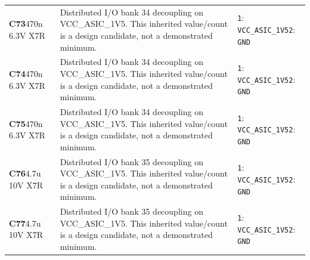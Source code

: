 \documentclass[11pt,a4paper]{article}
\begin{document}
\begin{longtable}{@{}P{27mm}P{84mm}P{57mm}@{}}
\textbf{C73}\newline 470n 6.3V X7R & Distributed I/O bank 34 decoupling on VCC\_ASIC\_1V5. This inherited value/count is a design candidate, not a demonstrated minimum. & \nolinkurl{1}: \nolinkurl{VCC_ASIC_1V5}\newline \nolinkurl{2}: \nolinkurl{GND} \\
\textbf{C74}\newline 470n 6.3V X7R & Distributed I/O bank 34 decoupling on VCC\_ASIC\_1V5. This inherited value/count is a design candidate, not a demonstrated minimum. & \nolinkurl{1}: \nolinkurl{VCC_ASIC_1V5}\newline \nolinkurl{2}: \nolinkurl{GND} \\
\textbf{C75}\newline 470n 6.3V X7R & Distributed I/O bank 34 decoupling on VCC\_ASIC\_1V5. This inherited value/count is a design candidate, not a demonstrated minimum. & \nolinkurl{1}: \nolinkurl{VCC_ASIC_1V5}\newline \nolinkurl{2}: \nolinkurl{GND} \\
\textbf{C76}\newline 4.7u 10V X7R & Distributed I/O bank 35 decoupling on VCC\_ASIC\_1V5. This inherited value/count is a design candidate, not a demonstrated minimum. & \nolinkurl{1}: \nolinkurl{VCC_ASIC_1V5}\newline \nolinkurl{2}: \nolinkurl{GND} \\
\textbf{C77}\newline 4.7u 10V X7R & Distributed I/O bank 35 decoupling on VCC\_ASIC\_1V5. This inherited value/count is a design candidate, not a demonstrated minimum. & \nolinkurl{1}: \nolinkurl{VCC_ASIC_1V5}\newline \nolinkurl{2}: \nolinkurl{GND} \\

\end{longtable}
\end{document}
